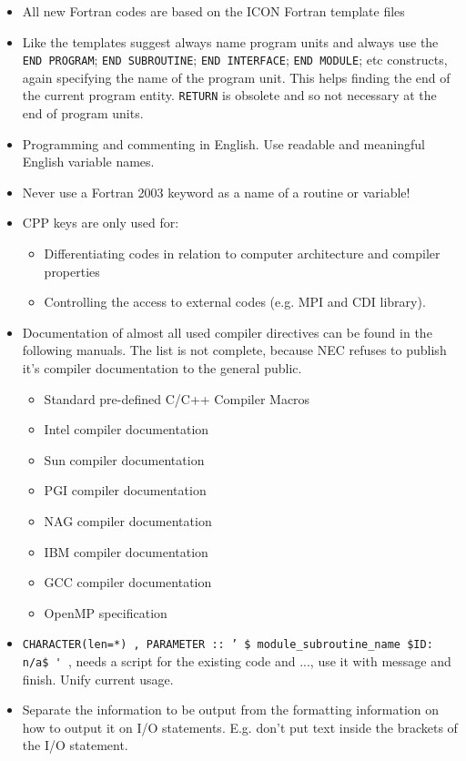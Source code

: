 \documentclass[a4paper,11pt,DIV16,BCOR1cm,titlepage]{scrartcl}
\begin{document}
\begin{itemize}  
\item All new Fortran codes are based on the ICON Fortran template files
\item Like the templates suggest always name program units and always use the \texttt{END  
PROGRAM}; \texttt{END SUBROUTINE}; \texttt{END INTERFACE}; \texttt{END 
MODULE}; etc constructs, again specifying the name of the program  
unit. This helps finding the end of the current program  
entity. \texttt{RETURN} is obsolete and so not necessary at the end of  
program units.
\item Programming and commenting in English. Use readable and meaningful English variable names.
\item Never use a Fortran 2003 keyword as a name of a routine or variable!
\item CPP keys are only used for:
\begin{itemize}  
\item Differentiating codes in relation to computer architecture and compiler properties
\item Controlling the access to external codes (e.g. MPI and CDI library).
\end{itemize}  
\item Documentation of almost all used compiler directives can be found in the following 
manuals. The list is not complete, because NEC refuses to publish it's compiler 
documentation to the general public.
\begin{itemize}  
\item Standard pre-defined C/C++ Compiler Macros
\item  Intel compiler documentation
\item  Sun compiler documentation
\item  PGI compiler documentation
\item  NAG compiler documentation
\item  IBM compiler documentation
\item  GCC compiler documentation
\item  OpenMP specification
\end{itemize}  
\item \texttt{CHARACTER(len=*) , PARAMETER :: ' \$ module\_subroutine\_name \$ID: n/a\$ \' }, 
needs a script for the existing code and ..., use it with message and finish. Unify current usage.
\item Separate the information to be output from the formatting
  information on how to output it on I/O statements. E.g. don't put
  text inside the brackets of the I/O statement.
\end{itemize} 
\end{document}
